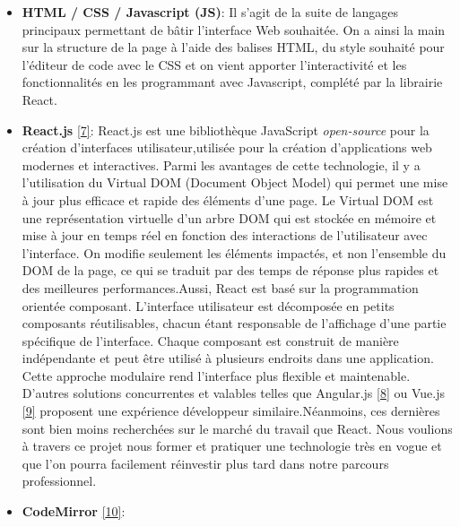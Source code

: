\documentclass[12pt]{article}
\begin{document}
\begin{itemize}
  \item
        \textbf{HTML / CSS / Javascript (JS)}: Il s'agit de la suite de
        langages principaux permettant de bâtir l'interface Web souhaitée. On
        a ainsi la main sur la structure de la page à l'aide des balises HTML,
        du style souhaité pour l'éditeur de code avec le CSS et on vient
        apporter l'interactivité et les fonctionnalités en les programmant
        avec Javascript, complété par la librairie React.
  \item
        \textbf{React.js} \protect\hyperlink{ref-react}{{[}7{]}}: React.js est
        une bibliothèque JavaScript \emph{open-source} pour la création
        d'interfaces utilisateur,utilisée pour la création d'applications web
        modernes et interactives. Parmi les avantages de cette technologie, il
        y a l'utilisation du Virtual DOM (Document Object Model) qui permet
        une mise à jour plus efficace et rapide des éléments d'une page. Le
        Virtual DOM est une représentation virtuelle d'un arbre DOM qui est
        stockée en mémoire et mise à jour en temps réel en fonction des
        interactions de l'utilisateur avec l'interface. On modifie seulement
        les éléments impactés, et non l'ensemble du DOM de la page, ce qui se
        traduit par des temps de réponse plus rapides et des meilleures
        performances.\newline  Aussi, React est basé sur la programmation
        orientée composant. L'interface utilisateur est décomposée en petits
        composants réutilisables, chacun étant responsable de l'affichage
        d'une partie spécifique de l'interface. Chaque composant est construit
        de manière indépendante et peut être utilisé à plusieurs endroits dans
        une application. Cette approche modulaire rend l'interface plus
        flexible et maintenable. D'autres solutions concurrentes et valables
        telles que Angular.js \protect\hyperlink{ref-angularjs}{{[}8{]}} ou
        Vue.js \protect\hyperlink{ref-vuejs}{{[}9{]}} proposent une expérience
        développeur similaire.\newline  Néanmoins, ces dernières sont bien
        moins recherchées sur le marché du travail que React. Nous voulions à
        travers ce projet nous former et pratiquer une technologie très en
        vogue et que l'on pourra facilement réinvestir plus tard dans notre
        parcours professionnel.
  \item
        \textbf{CodeMirror} \protect\hyperlink{ref-codemirror}{{[}10{]}}:

\end{itemize}
\end{document}

